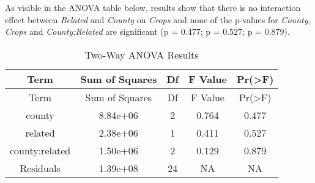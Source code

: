 \documentclass[
]{article}
\begin{document}
As visible in the ANOVA table below, results show that there is no
interaction effect between \emph{Related} and \emph{County} on
\emph{Crops} and none of the p-values for \emph{County}, \emph{Crops}
and \emph{County:Related} are significant (p = 0.477; p = 0.527; p =
0.879).

\begin{longtable}[]{@{}ccccc@{}}
\caption{Two-Way ANOVA Results}\tabularnewline
\toprule\noalign{}
Term & Sum of Squares & Df & F Value & Pr(\textgreater F) \\
\midrule\noalign{}
\endfirsthead
\toprule\noalign{}
Term & Sum of Squares & Df & F Value & Pr(\textgreater F) \\
\midrule\noalign{}
\endhead
\bottomrule\noalign{}
\endlastfoot
county & 8.84e+06 & 2 & 0.764 & 0.477 \\
related & 2.38e+06 & 1 & 0.411 & 0.527 \\
county:related & 1.50e+06 & 2 & 0.129 & 0.879 \\
Residuals & 1.39e+08 & 24 & NA & NA \\
\end{longtable}
\end{document}
